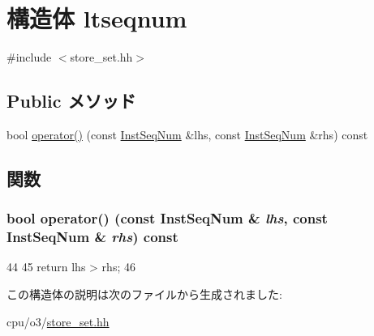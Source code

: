 \hypertarget{structltseqnum}{
\section{構造体 ltseqnum}
\label{structltseqnum}
}


{\ttfamily \#include $<$store\_\-set.hh$>$}\subsection*{Public メソッド}
\begin{DoxyCompactItemize}
\item 
bool \hyperlink{structltseqnum_afd1399390bbd8902dd8a358b101e521c}{operator()} (const \hyperlink{inst__seq_8hh_a258d93d98edaedee089435c19ea2ea2e}{InstSeqNum} \&lhs, const \hyperlink{inst__seq_8hh_a258d93d98edaedee089435c19ea2ea2e}{InstSeqNum} \&rhs) const 
\end{DoxyCompactItemize}


\subsection{関数}
\hypertarget{structltseqnum_afd1399390bbd8902dd8a358b101e521c}{
\subsubsection[{operator()}]{\setlength{\rightskip}{0pt plus 5cm}bool operator() (const {\bf InstSeqNum} \& {\em lhs}, \/  const {\bf InstSeqNum} \& {\em rhs}) const}}
\label{structltseqnum_afd1399390bbd8902dd8a358b101e521c}



\begin{DoxyCode}
44     {
45         return lhs > rhs;
46     }
\end{DoxyCode}


この構造体の説明は次のファイルから生成されました:\begin{DoxyCompactItemize}
\item 
cpu/o3/\hyperlink{store__set_8hh}{store\_\-set.hh}\end{DoxyCompactItemize}
